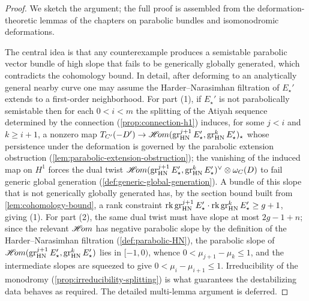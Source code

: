 \begin{proof}
  We sketch the argument; the full proof is assembled from the deformation-theoretic
  lemmas of the chapters on parabolic bundles and isomonodromic deformations.

  The central idea is that any counterexample produces a semistable parabolic
  vector bundle of high slope that fails to be generically globally generated,
  which contradicts the cohomology bound. In detail, after deforming to an
  analytically general nearby curve one may assume the Harder--Narasimhan
  filtration of $E_\star'$ extends to a first-order neighborhood. For part (1),
  if $E_\star'$ is not parabolically semistable then for each $0 < i < m$ the
  splitting of the Atiyah sequence determined by the connection
  (\cref{prop:connection-h1}) induces, for some $j < i$ and $k \geq i+1$, a
  nonzero map $T_{C'}(-D') \to \mathop{\mathscr{H}\!om}(\operatorname{gr}^{j+1}_{\mathrm{HN}} E_\star',
  \operatorname{gr}^k_{\mathrm{HN}} E_\star')_\star$ whose persistence under the deformation is governed
  by the parabolic extension obstruction (\cref{lem:parabolic-extension-obstruction});
  the vanishing of the induced map on $H^1$ forces the dual twist
  $\mathop{\mathscr{H}\!om}(\operatorname{gr}^{j+1}_{\mathrm{HN}} E_\star', \operatorname{gr}^k_{\mathrm{HN}} E_\star')^\vee \otimes
  \omega_C(D)$ to fail generic global generation
  (\cref{def:generic-global-generation}). A bundle of this slope that is not
  generically globally generated has, by the section bound built from
  \cref{lem:cohomology-bound}, a rank constraint
  $\operatorname{rk} \operatorname{gr}^{j+1}_{\mathrm{HN}} E_\star' \cdot \operatorname{rk} \operatorname{gr}^k_{\mathrm{HN}} E_\star' \geq g + 1$,
  giving (1). For part (2), the same dual twist must have slope at most
  $2g - 1 + n$; since the relevant $\mathop{\mathscr{H}\!om}$ has negative parabolic slope by the
  definition of the Harder--Narasimhan filtration (\cref{def:parabolic-HN}), the
  parabolic slope of $\mathop{\mathscr{H}\!om}(\operatorname{gr}^{j+1}_{\mathrm{HN}} E_\star', \operatorname{gr}^k_{\mathrm{HN}} E_\star')$
  lies in $[-1, 0)$, whence $0 < \mu_{j+1} - \mu_k \leq 1$, and the intermediate
  slopes are squeezed to give $0 < \mu_i - \mu_{i+1} \leq 1$. Irreducibility of
  the monodromy (\cref{prop:irreducibility-splitting}) is what guarantees the
  destabilizing data behaves as required. The detailed multi-lemma argument is
  deferred.
\end{proof}

